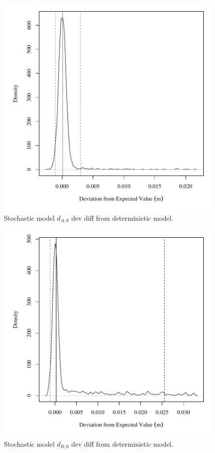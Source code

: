 \begin{center}
\begin{figure}[htbp]
	\includegraphics[width=6in]{"Figures/Results_USR/V dev diff depthA1"}
	\caption{Stochastic model $d_{A,0}$ dev diff from deterministic model.}
\end{figure}
\end{center}
\newpage

\begin{center}
\begin{figure}[htbp]
	\includegraphics[width=6in]{"Figures/Results_USR/V dev diff depthC1"}
	\caption{Stochastic model $d_{B,0}$ dev diff from deterministic model.}
\end{figure}
\end{center}
\newpage

